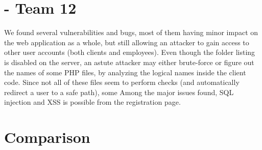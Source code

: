 \section{\gnb - Team 12}
We found several vulnerabilities and bugs, most of them having minor impact on the web application as a whole, but still allowing an attacker to gain access to other user accounts (both clients and employees).\newline\newline
Even though the folder listing is disabled on the server, an astute attacker may either brute-force or figure out the names of some PHP files, by analyzing the logical names inside the client code. Since not all of these files seem to perform checks (and automatically redirect a user to a safe path), some  
Among the major issues found, SQL injection and XSS is possible from the registration page.

\section{Comparison}
